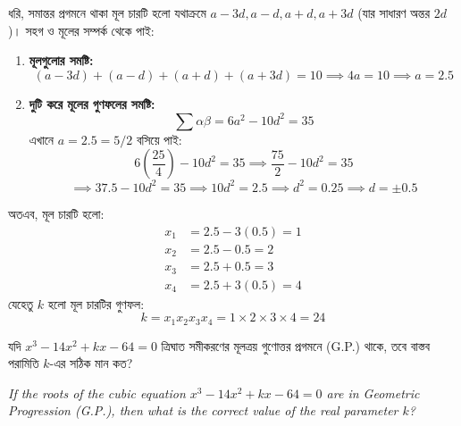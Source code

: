 \documentclass[12pt, a4paper]{article}
\begin{document}
\begin{tcolorbox}[solutionbox={সমাধান (Solution)}]
    \noindent
    ধরি, সমান্তর প্রগমনে থাকা মূল চারটি হলো যথাক্রমে $a-3d, a-d, a+d, a+3d$ (যার সাধারণ অন্তর $2d$)। 
    সহগ ও মূলের সম্পর্ক থেকে পাই:
    \begin{enumerate}[itemsep=0.4em]
        \item \textbf{মূলগুলোর সমষ্টি:} 
        \[ (a-3d) + (a-d) + (a+d) + (a+3d) = 10 \implies 4a = 10 \implies a = 2.5 \]
        \item \textbf{দুটি করে মূলের গুণফলের সমষ্টি:} 
        \[ \sum \alpha\beta = 6a^2 - 10d^2 = 35 \]
        এখানে $a = 2.5 = 5/2$ বসিয়ে পাই:
        \[ 6\left(\frac{25}{4}\right) - 10d^2 = 35 \implies \frac{75}{2} - 10d^2 = 35 \]
        \[ \implies 37.5 - 10d^2 = 35 \implies 10d^2 = 2.5 \implies d^2 = 0.25 \implies d = \pm 0.5 \]
    \end{enumerate}
    
    \vspace{0.5em}
    অতএব, মূল চারটি হলো:
    \begin{align*}
        x_1 &= 2.5 - 3(0.5) = 1 \\
        x_2 &= 2.5 - 0.5 = 2 \\
        x_3 &= 2.5 + 0.5 = 3 \\
        x_4 &= 2.5 + 3(0.5) = 4
    \end{align*}
    যেহেতু $k$ হলো মূল চারটির গুণফল:
    \[ k = x_1 x_2 x_3 x_4 = 1 \times 2 \times 3 \times 4 = 24 \]
\end{tcolorbox}

\vspace{1.5em}

\begin{tcolorbox}[questionbox={প্রশ্ন (Question) 44}]
    \noindent
    যদি $x^3 - 14x^2 + kx - 64 = 0$ ত্রিঘাত সমীকরণের মূলত্রয় গুণোত্তর প্রগমনে (G.P.) থাকে, তবে বাস্তব পরামিতি $k$-এর সঠিক মান কত?
    
    \vspace{0.8em}
    \begin{english}
    \noindent\textit{\color{darkgray}
    If the roots of the cubic equation $x^3 - 14x^2 + kx - 64 = 0$ are in Geometric Progression (G.P.), then what is the correct value of the real parameter $k$?
    }
    \end{english}
\end{tcolorbox}
\end{document}
